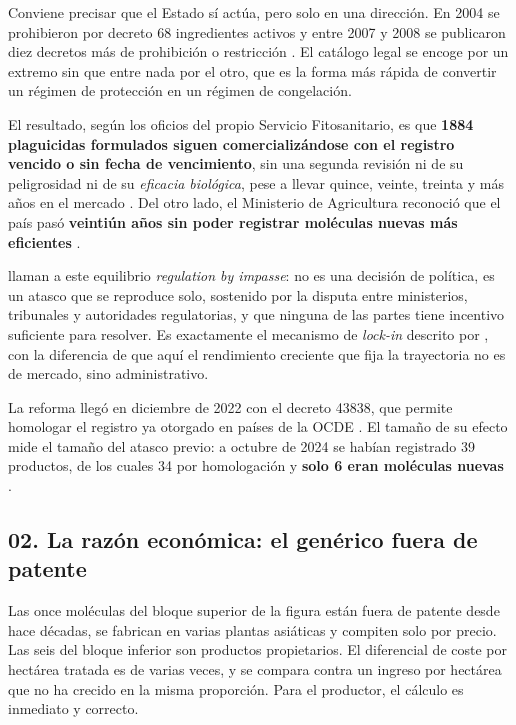 \documentclass[11pt,letterpaper]{article}
\begin{document}
Conviene precisar que el Estado sí actúa, pero solo en una dirección. En 2004 se
prohibieron por decreto 68 ingredientes activos y entre 2007 y 2008 se
publicaron diez decretos más de prohibición o restricción
\parencite{rojas2016}. El catálogo legal se encoge por un extremo sin que entre
nada por el otro, que es la forma más rápida de convertir un régimen de
protección en un régimen de congelación.

El resultado, según los oficios del propio Servicio Fitosanitario, es que
\textbf{\num{1884} plaguicidas formulados siguen comercializándose con el
registro vencido o sin fecha de vencimiento}, sin una segunda revisión ni de su
peligrosidad ni de su \emph{eficacia biológica}, pese a llevar quince, veinte,
treinta y más años en el mercado \parencite{vargas2021}. Del otro lado, el
Ministerio de Agricultura reconoció que el país pasó \textbf{veintiún años sin
poder registrar moléculas nuevas más eficientes} \parencite{delfino2024}.

\textcite{castrovargas2023} llaman a este equilibrio \emph{regulation by
impasse}: no es una decisión de política, es un atasco que se reproduce solo,
sostenido por la disputa entre ministerios, tribunales y autoridades
regulatorias, y que ninguna de las partes tiene incentivo suficiente para
resolver. Es exactamente el mecanismo de \emph{lock-in} descrito por
\textcite{arthur1989}, con la diferencia de que aquí el rendimiento creciente
que fija la trayectoria no es de mercado, sino administrativo.

La reforma llegó en diciembre de 2022 con el decreto 43838, que permite
homologar el registro ya otorgado en países de la OCDE \parencite{decreto43838}.
El tamaño de su efecto mide el tamaño del atasco previo: a octubre de 2024 se
habían registrado 39 productos, de los cuales 34 por homologación y
\textbf{solo 6 eran moléculas nuevas} \parencite{delfino2024}.

\subsection*{02. La razón económica: el genérico fuera de patente}

Las once moléculas del bloque superior de la figura están fuera de patente desde
hace décadas, se fabrican en varias plantas asiáticas y compiten solo por precio.
Las seis del bloque inferior son productos propietarios. El diferencial de coste
por hectárea tratada es de varias veces, y se compara contra un ingreso por
hectárea que no ha crecido en la misma proporción. Para el productor, el cálculo
es inmediato y correcto.
\end{document}
